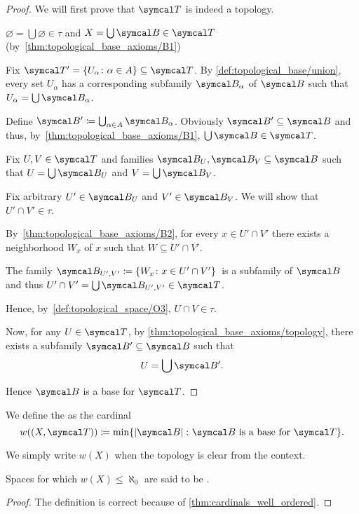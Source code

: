 \begin{proof}
  We will first prove that \( \Cal{T} \) is indeed a topology.

  \begin{description}
     \( \varnothing = \bigcup \varnothing \in \tau \) and \( X = \bigcup \Cal{B} \in \Cal{T} \) (by~\ref{thm:topological_base_axioms/B1})

     Fix \( \Cal{T}' = \{ U_\alpha \colon \alpha \in A \} \subseteq \Cal{T} \). By \cref{def:topological_base/union}, every set \( U_\alpha \) has a corresponding subfamily \( \Cal{B}_\alpha \) of \( \Cal{B} \) such that \( U_\alpha = \bigcup \Cal{B}_\alpha \).

    Define \( \Cal{B}' \coloneqq \bigcup_{\alpha \in A} \Cal{B}_\alpha \). Obviously \( \Cal{B}' \subseteq \Cal{B} \) and thus, by~\ref{thm:topological_base_axioms/B1}, \( \bigcup \Cal{B} \in \Cal{T} \).

     Fix \( U, V \in \Cal{T} \) and families \( \Cal{B}_U, \Cal{B}_V \subseteq \Cal{B} \) such that \( U = \bigcup \Cal{B}_U \) and \( V = \bigcup \Cal{B}_V \).

    Fix arbitrary \( U' \in \Cal{B}_U \) and \( V' \in \Cal{B}_V \). We will show that \( U' \cap V' \in \tau \).

    By~\ref{thm:topological_base_axioms/B2}, for every \( x \in U' \cap V' \) there exists a neighborhood \( W_x \) of \( x \) such that \( W \subseteq U' \cap V' \).

    The family \( \Cal{B}_{U',V'} \coloneqq \{ W_x \colon x \in U' \cap V' \} \)~\AOC is a subfamily of \( \Cal{B} \) and thus \( U' \cap V' = \bigcup \Cal{B}_{U',V'} \in \Cal{T} \).

    Hence, by~\ref{def:topological_space/O3}, \( U \cap V \in \tau \).
  \end{description}

  Now, for any \( U \in \Cal{T} \), by \cref{thm:topological_base_axioms/topology}, there exists a subfamily \( \Cal{B}' \subseteq \Cal{B} \) such that
  \begin{equation*}
    U = \bigcup \Cal{B}'.
  \end{equation*}

  Hence \( \Cal{B} \) is a base for \( \Cal{T} \).
\end{proof}

\begin{definition}\label{def:topological_space_weight}
  We define the  as the cardinal
  \begin{equation*}
    w((X, \Cal{T})) \coloneqq \min \{ \Abs{\Cal{B}} \colon \Cal{B} \text{ is a base for } \Cal{T} \}.
  \end{equation*}

  We simply write \( w(X) \) when the topology is clear from the context.

  Spaces for which \( w(X) \leq \aleph_0 \) are said to be .
\end{definition}
\begin{proof}
  The definition is correct because of \cref{thm:cardinals_well_ordered}.
\end{proof}

